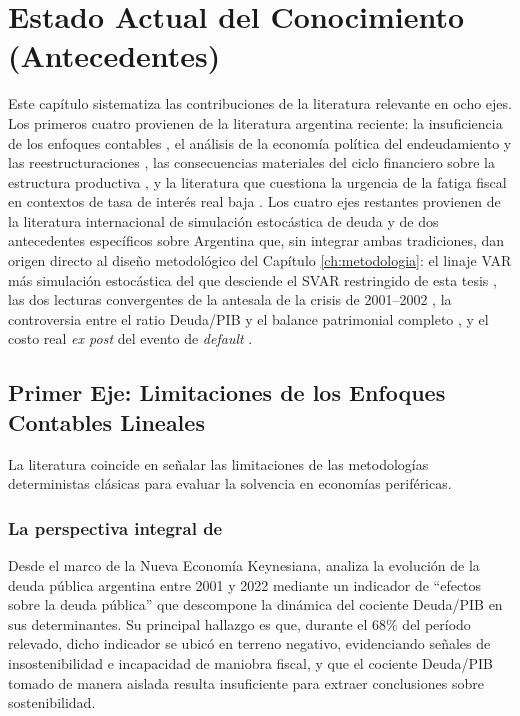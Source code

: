 \chapter{Estado Actual del Conocimiento (Antecedentes)}
\label{ch:antecedentes}

Este capítulo sistematiza las contribuciones de la literatura relevante en ocho ejes. Los primeros cuatro provienen de la literatura argentina reciente: la insuficiencia de los enfoques contables \citep{rodriguez2023, sanches2019}, el análisis de la economía política del endeudamiento y las reestructuraciones \citep{aruguete2021, roldan2021}, las consecuencias materiales del ciclo financiero sobre la estructura productiva \citep{bohoslavsky2024, cantamutto2024}, y la literatura que cuestiona la urgencia de la fatiga fiscal en contextos de tasa de interés real baja \citep{blanchard1990, blanchard2019}. Los cuatro ejes restantes provienen de la literatura internacional de simulación estocástica de deuda y de dos antecedentes específicos sobre Argentina que, sin integrar ambas tradiciones, dan origen directo al diseño metodológico del Capítulo \ref{ch:metodologia}: el linaje VAR más simulación estocástica del que desciende el SVAR restringido de esta tesis \citep{medeiros2012, adler2014, wijayanti2020}, las dos lecturas convergentes de la antesala de la crisis de 2001--2002 \citep{cetrangolo1997, calvo2003}, la controversia entre el ratio Deuda/PIB y el balance patrimonial completo \citep{levyyeyati2021}, y el costo real \textit{ex post} del evento de \textit{default} \citep{hebert2017}.

\section{Primer Eje: Limitaciones de los Enfoques Contables Lineales}
\label{sec:eje1}

La literatura coincide en señalar las limitaciones de las metodologías deterministas clásicas para evaluar la solvencia en economías periféricas.

\subsection{La perspectiva integral de \texorpdfstring{\textcite{rodriguez2023}}{Rodríguez (2023)}}
Desde el marco de la Nueva Economía Keynesiana, \textcite{rodriguez2023} analiza la evolución de la deuda pública argentina entre 2001 y 2022 mediante un indicador de ``efectos sobre la deuda pública'' que descompone la dinámica del cociente Deuda/PIB en sus determinantes. Su principal hallazgo es que, durante el 68\% del período relevado, dicho indicador se ubicó en terreno negativo, evidenciando señales de insostenibilidad e incapacidad de maniobra fiscal, y que el cociente Deuda/PIB tomado de manera aislada resulta insuficiente para extraer conclusiones sobre sostenibilidad.

